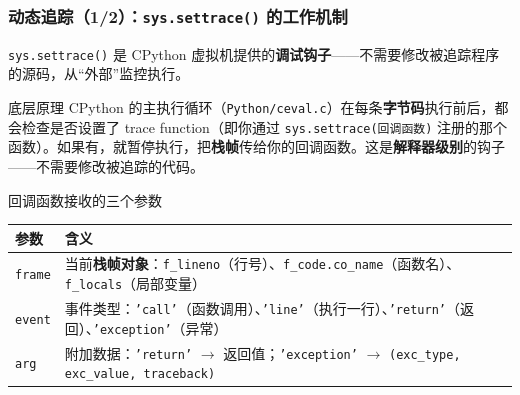 \documentclass[presentation,aspectratio=169,fontset=none]{ctexbeamer}
\begin{document}
\begin{frame}
\frametitle{动态追踪（1/2）：\texttt{sys.settrace()} 的工作机制}
{\footnotesize \texttt{sys.settrace()} 是 CPython 虚拟机提供的\textbf{调试钩子}——不需要修改被追踪程序的源码，从``外部''监控执行。}

\vspace{0.1cm}
\begin{block}{\footnotesize 底层原理}
{\footnotesize CPython 的主执行循环（\texttt{Python/ceval.c}）在每条\textbf{字节码}执行前后，都会检查是否设置了 trace function（即你通过 \texttt{sys.settrace(回调函数)} 注册的那个函数）。如果有，就暂停执行，把\textbf{栈帧}传给你的回调函数。这是\textbf{解释器级别}的钩子——不需要修改被追踪的代码。}
\end{block}

\vspace{0.1cm}
\begin{block}{\footnotesize 回调函数接收的三个参数}
{\footnotesize
\begin{tabular}{lp{7.5cm}}
\toprule
\textbf{参数} & \textbf{含义} \\
\midrule
\texttt{frame} & 当前\textbf{栈帧对象}：\texttt{f\_lineno}（行号）、\texttt{f\_code.co\_name}（函数名）、\texttt{f\_locals}（局部变量） \\
\texttt{event} & 事件类型：\texttt{'call'}（函数调用）、\texttt{'line'}（执行一行）、\texttt{'return'}（返回）、\texttt{'exception'}（异常） \\
\texttt{arg} & 附加数据：\texttt{'return'} $\rightarrow$ 返回值；\texttt{'exception'} $\rightarrow$ \texttt{(exc\_type, exc\_value, traceback)} \\
\bottomrule
\end{tabular}}
\end{block}
\end{frame}

\end{document}
